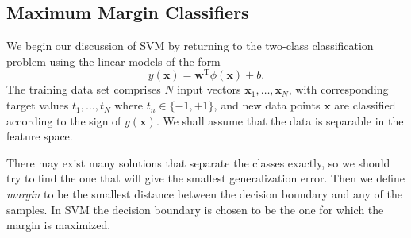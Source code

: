 \documentclass[a4paper]{book}
\newcommand{\mrm}{\mathrm}
\newcommand{\mbf}{\mathbf}
\newcommand{\ww}{\mbf w}
\newcommand{\xx}{\mbf x}
\newcommand{\trans}{^{\mrm T}}
\begin{document}
\subsection{Maximum Margin Classifiers}
We begin our discussion of SVM by returning to the two-class classification problem using the linear models of the form
\begin{equation}\label{}
  y(\xx) = \ww\trans\phi(\xx)+b.
\end{equation}
The training data set comprises $N$ input vectors $\xx_1,\dots,\xx_N$, with corresponding target values $t_1,\dots,t_N$ where $t_n \in \{-1,+1\}$, and new data points $\xx$ are classified according to the sign of $y(\xx)$. We shall assume that the data is separable in the feature space.

There may exist many solutions that separate the classes exactly, so we should try to find the one that will give the smallest generalization error. Then we define \textit{margin} to be the smallest distance between the decision boundary and any of the samples. In SVM the decision boundary is chosen to be the one for which the margin is maximized.
\end{document}
